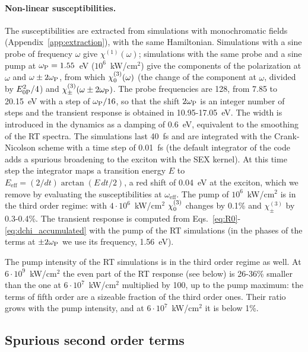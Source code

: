 \documentclass[aps,prb,reprint,superscriptaddress,amsmath,amssymb]{revtex4-2}
\begin{document}
\paragraph*{Non-linear susceptibilities.} The susceptibilities are extracted from simulations with monochromatic
fields (Appendix~\ref{app:extraction}), with the same Hamiltonian. Simulations with a sine probe of frequency $\omega$
give $\chi^{(1)}(\omega)$; simulations with the same probe and a sine pump at $\omega_{\mathrm{P}} = 1.55$~eV
($10^6$~kW/cm$^2$) give the components of the polarization at $\omega$ and $\omega\pm2\omega_{\mathrm{P}}$, from which $\chi^{(3)}_{0}(\omega)$
(the change of the component at $\omega$, divided by $E_{0\mathrm{P}}^2/4$) and $\chi^{(3)}_\pm(\omega\pm2\omega_{\mathrm{P}})$. The probe
frequencies are 128, from 7.85 to 20.15~eV with a step of $\omega_{\mathrm{P}}/16$, so that the shift $2\omega_{\mathrm{P}}$ is an integer number of
steps and the transient response is obtained in 10.95-17.05~eV. The width is introduced in the dynamics as a damping of
0.6~eV, equivalent to the smoothing of the RT spectra. The simulations last 40~fs and are integrated with the
Crank-Nicolson scheme with a time step of 0.01~fs (the default integrator of the code adds a spurious broadening to the
exciton with the SEX kernel). At this time step the integrator maps a transition energy $E$ to
$E_{\mathrm{eff}} = (2/dt)\arctan(E\,dt/2)$, a red shift of 0.04~eV at the exciton, which we remove by evaluating the
susceptibilities at $\omega_{\mathrm{eff}}$. The pump of $10^6$~kW/cm$^2$ is in the third order regime: with
$4\cdot10^6$~kW/cm$^2$ $\chi^{(3)}_{0}$ changes by 0.1\% and $\chi^{(3)}_\pm$ by 0.3-0.4\%. The transient response is
computed from Eqs.~\eqref{eq:R0}-\eqref{eq:dchi_accumulated} with the pump of the RT simulations (in the phases of the
terms at $\pm2\omega_{\mathrm{P}}$ we use its frequency, 1.56~eV).

The pump intensity of the RT simulations is in the third order regime as well. At $6\cdot10^9$~kW/cm$^2$ the even part
of the RT response (see below) is 26-36\% smaller than the one at $6\cdot10^7$~kW/cm$^2$ multiplied by 100, up to the
pump maximum: the terms of fifth order are a sizeable fraction of the third order ones. Their ratio grows with the pump
intensity, and at $6\cdot10^7$~kW/cm$^2$ it is below 1\%.

\subsection{Spurious second order terms}
\label{sec:lif_odd}
\end{document}
